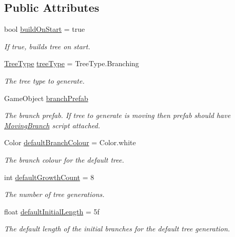 \subsection*{Public Attributes}
\begin{DoxyCompactItemize}
\item 
bool \hyperlink{class_fractal_tree_1_1_tree_builder_a430c3374fd2e1302f232d08bca9558b2}{build\+On\+Start} = true
\begin{DoxyCompactList}\small\item\em If true, builds tree on start. \end{DoxyCompactList}\item 
\hyperlink{class_fractal_tree_1_1_tree_builder_a955d67cfa976440cc427e591be74f979}{Tree\+Type} \hyperlink{class_fractal_tree_1_1_tree_builder_aa2f66ebffbf59d18232884f85e95490d}{tree\+Type} = Tree\+Type.\+Branching
\begin{DoxyCompactList}\small\item\em The tree type to generate. \end{DoxyCompactList}\item 
Game\+Object \hyperlink{class_fractal_tree_1_1_tree_builder_a3cc99e5fd404b3916dc29f5dc5223d8c}{branch\+Prefab}
\begin{DoxyCompactList}\small\item\em The branch prefab. If tree to generate is moving then prefab should have \hyperlink{interface_fractal_tree_1_1_moving_branch}{Moving\+Branch} script attached. \end{DoxyCompactList}\item 
Color \hyperlink{class_fractal_tree_1_1_tree_builder_a5277c397ded85184011c9ccda8f83563}{default\+Branch\+Colour} = Color.\+white
\begin{DoxyCompactList}\small\item\em The branch colour for the default tree. \end{DoxyCompactList}\item 
int \hyperlink{class_fractal_tree_1_1_tree_builder_a6f7229c6652a8d52f4227f5e7dce3123}{default\+Growth\+Count} = 8
\begin{DoxyCompactList}\small\item\em The number of tree generations. \end{DoxyCompactList}\item 
float \hyperlink{class_fractal_tree_1_1_tree_builder_a34195cdf1a552ee1027bfbf42682ea29}{default\+Initial\+Length} = 5f
\begin{DoxyCompactList}\small\item\em The default length of the initial branches for the default tree generation. \end{DoxyCompactList}\item 

\end{DoxyCompactItemize}
